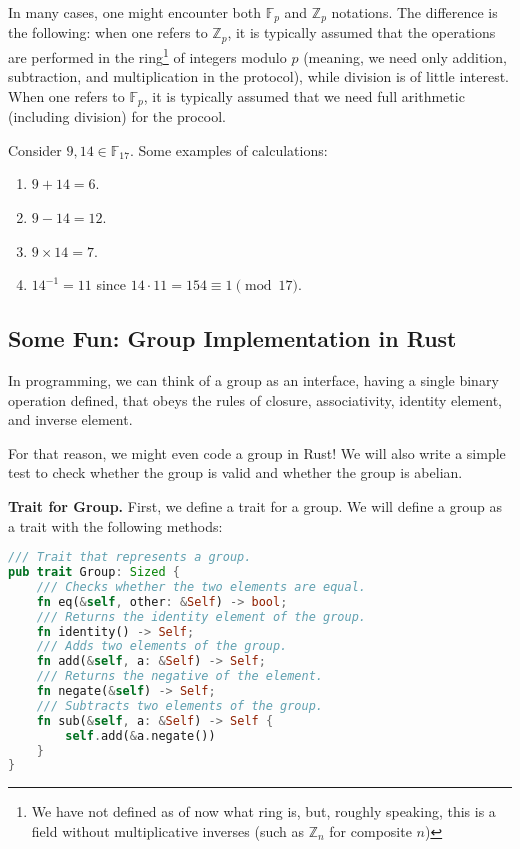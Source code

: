 \documentclass[../lecture-notes-148x210.tex]{subfiles}
\begin{document}
\begin{remark}
    In many cases, one might encounter both $\mathbb{F}_p$ and $\mathbb{Z}_p$ notations. The difference is the 
    following: when one refers to $\mathbb{Z}_p$, it is typically assumed that the operations are performed in 
    the ring\footnote{We have not defined as of now what ring is, but, roughly speaking, this is a field without 
    multiplicative inverses (such as $\mathbb{Z}_n$ for composite $n$)} of integers modulo $p$ (meaning, we need only addition, subtraction, and multiplication 
    in the protocol), while division is of little interest. When one refers to $\mathbb{F}_p$, it is typically 
    assumed that we need full arithmetic (including division) for the procool.
\end{remark}

\begin{example}
    Consider $9, 14 \in \mathbb{F}_{17}$. Some examples of calculations:
    \begin{enumerate}
        \item $9+14 = 6$.
        \item $9-14 = 12$.
        \item $9 \times 14 = 7$.
        \item $14^{-1} = 11$ since $14 \cdot 11 = 154 \equiv 1 \pmod{17}$.
    \end{enumerate}
\end{example}

\subsection{Some Fun: Group Implementation in Rust}

In programming, we can think of a group as an interface, having a single binary operation defined, that obeys the 
rules of closure, associativity, identity element, and inverse element.

For that reason, we might even code a group in Rust! We will also write a simple test to check whether the group is 
valid and whether the group is abelian.

\textbf{Trait for Group.} First, we define a trait for a group. We will define a group as a trait with the following methods:
\begin{lstlisting}[language=Rust]
/// Trait that represents a group.
pub trait Group: Sized {
    /// Checks whether the two elements are equal.
    fn eq(&self, other: &Self) -> bool;
    /// Returns the identity element of the group.
    fn identity() -> Self;
    /// Adds two elements of the group.
    fn add(&self, a: &Self) -> Self;
    /// Returns the negative of the element.
    fn negate(&self) -> Self;
    /// Subtracts two elements of the group.
    fn sub(&self, a: &Self) -> Self {
        self.add(&a.negate())
    }
}
\end{lstlisting}
\end{document}
